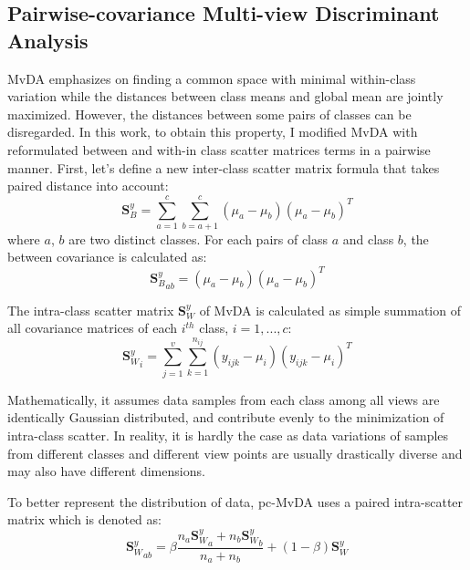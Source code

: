 
\subsection{Pairwise-covariance Multi-view Discriminant Analysis}
    MvDA emphasizes on finding a common space with minimal within-class variation while the distances between class means and global mean are jointly maximized.
    However, the distances between some pairs of classes can be disregarded.
    In this work, to obtain this property, I modified MvDA with reformulated between and with-in class scatter matrices terms in a pairwise manner.
    First, let's define a new inter-class scatter matrix formula that takes paired distance into account:
    \begin{equation}
        \boldsymbol{S}_B^y=\sum_{a=1}^{c}\sum_{b=a+1}^{c}{\left(\mu_a-\mu_b\right)\left(\mu_a-\mu_b\right)^T}
    \end{equation}
    where $a$, $b$ are two distinct classes. For each pairs of class $a$ and class $b$, the between covariance is calculated as:
    \begin{equation}
        {\boldsymbol{S}_B^y}_{ab}={\left(\mu_a-\mu_b\right)\left(\mu_a-\mu_b\right)^T}
        \label{eq:pcmvda_Sb_ab}
    \end{equation}

    The intra-class scatter matrix $\boldsymbol{S}_W^y$ of MvDA is calculated as simple summation of all covariance matrices of each $i^{th}$ class, $i = {1,...,c}$:
    \begin{equation}
        {\boldsymbol{S}_W^y}_i=\sum_{j=1}^{v}\sum_{k=1}^{n_{ij}}\left(y_{ijk}-\mu_i\right)\left(y_{ijk}-\mu_i\right)^T
        \label{eq:pcmvda_Sw_i}
    \end{equation}

    Mathematically, it assumes data samples from each class among all views are identically Gaussian distributed, and contribute evenly to the minimization of intra-class scatter.
    In reality, it is hardly the case as data variations of samples from different classes and different view points are usually drastically diverse and may also have different dimensions.

    To better represent the distribution of data, pc-MvDA uses a paired intra-scatter matrix which is denoted as:
    \begin{equation}
        {\boldsymbol{S}_W^y}_{ab}=\beta\frac{n_a{\boldsymbol{S}_W^y}_a+n_b{\boldsymbol{S}_W^y}_b}{n_a+n_b}+\left(1-\beta\right){\boldsymbol{S}_W^y}
        \label{eq:pcmvda_Sw_ab}
    \end{equation}

